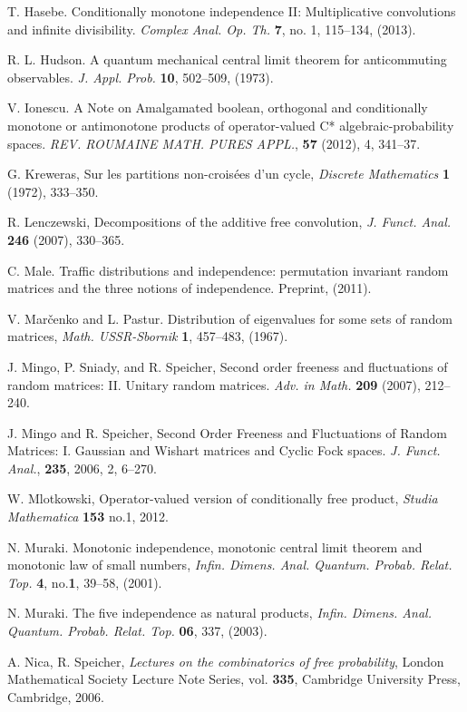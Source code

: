\documentclass[ECP]{ejpecp} %
\begin{document}
\begin{thebibliography}{99}
 T. Hasebe. Conditionally monotone independence II: Multiplicative convolutions and infinite divisibility. \emph{Complex Anal. Op. Th.} {\bf 7}, no. 1, 115--134, (2013).

 R. L. Hudson. A quantum mechanical central limit theorem for anticommuting observables.
\emph{J. Appl. Prob.} {\bf 10}, 502--509, (1973).

 V. Ionescu. A Note on Amalgamated boolean, orthogonal and conditionally monotone or antimonotone products of operator-valued C* algebraic-probability spaces.  \emph{ REV. ROUMAINE MATH. PURES APPL.}, {\bf 57} (2012), 4, 341--37.

 G. Kreweras, Sur les partitions non-croisées d’un cycle, \emph{Discrete Mathematics} {\bf 1} (1972), 333--350.

 R. Lenczewski, Decompositions of the additive free convolution, \emph{J. Funct. Anal.} {\bf 246} (2007), 330--365.

 C. Male. Traffic distributions and independence: permutation invariant random matrices and the three notions of independence. Preprint, (2011).

 V. Mar\v cenko and L. Pastur. Distribution of eigenvalues for some
sets of random matrices, \emph{Math. USSR-Sbornik} {\bf 1}, 457--483, (1967).

 J. Mingo, P. Sniady, and R. Speicher, Second order freeness and fluctuations of random matrices: II. Unitary random matrices. \emph{Adv. in Math.} {\bf 209} (2007), 212--240.

J. Mingo and R. Speicher, Second Order Freeness and Fluctuations of Random Matrices: I. Gaussian and Wishart matrices and Cyclic Fock spaces. \emph{J. Funct. Anal.}, {\bf 235}, 2006, 2, 6--270.

 W. Mlotkowski, Operator-valued version of conditionally free product, \emph{Studia Mathematica} {\bf 153} no.1, 2012.

 N. Muraki. Monotonic independence, monotonic central limit theorem and monotonic law of small numbers, \emph{Infin. Dimens. Anal. Quantum. Probab. Relat. Top.} {\bf 4}, no.{\bf 1}, 39--58, (2001).

 N. Muraki. The five independence as natural products, \emph{Infin. Dimens. Anal. Quantum. Probab. Relat. Top.} {\bf 06}, 337, (2003). 

 A. Nica, R. Speicher, \emph{Lectures on the combinatorics of free probability}, London Mathematical Society Lecture Note Series, vol. {\bf 335}, Cambridge University Press, Cambridge, 2006.


\end{thebibliography}
\end{document}
